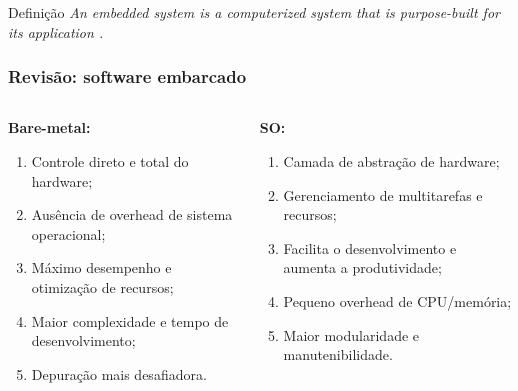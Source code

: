 \documentclass{beamer}
\begin{document}
\begin{frame}[fragile]
    \vfill
    \begin{block}{Definição}
        \textit{An embedded system is a computerized system that is purpose-built for its application \cite{white_2024}.}
    \end{block}
\end{frame}

\begin{frame}[fragile]
    \frametitle{Revisão: software embarcado}

    \begin{columns}[t]
        \begin{column}{0.5\textwidth}
            \textbf{Bare-metal:}
            \vspace{0.25cm}
            \begin{enumerate}\small
                \item Controle direto e total do hardware;
                \item Ausência de overhead de sistema operacional;
                \item Máximo desempenho e otimização de recursos;
                \item Maior complexidade e tempo de desenvolvimento;
                \item Depuração mais desafiadora.
            \end{enumerate}
        \end{column}
        
        \begin{column}{0.5\textwidth}
            \textbf{SO:}
            \vspace{0.25cm}
            \begin{enumerate}\small
                \item Camada de abstração de hardware;
                \item Gerenciamento de multitarefas e recursos;
                \item Facilita o desenvolvimento e aumenta a produtividade;
                \item Pequeno overhead de CPU/memória;
                \item Maior modularidade e manutenibilidade.
            \end{enumerate}
        \end{column}
    \end{columns}
\end{frame}
\end{document}
